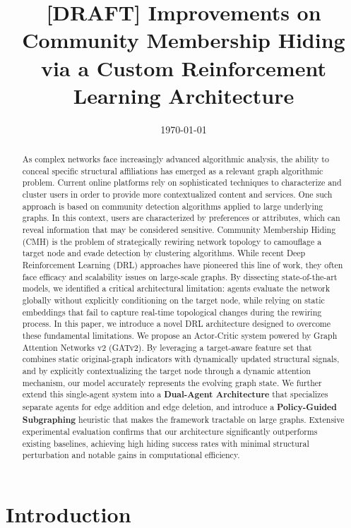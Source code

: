 \documentclass[a4paper]{article}
\title{\textbf{[DRAFT] Improvements on Community Membership Hiding\\
via a Custom Reinforcement Learning Architecture}}
\author{}
\date{\today}
\begin{document}
\maketitle

\begin{abstract}
As complex networks face increasingly advanced algorithmic analysis, the ability
to conceal specific structural affiliations has emerged as a relevant graph
algorithmic problem. Current online platforms rely on sophisticated techniques
to characterize and cluster users in order to provide more contextualized content
and services. One such approach is based on community detection algorithms applied
to large underlying graphs. In this context, users are characterized by preferences
or attributes, which can reveal information that may be considered sensitive.
Community Membership Hiding (CMH) is the problem of strategically rewiring network
topology to camouflage a target node and evade detection by clustering algorithms.
While recent Deep Reinforcement Learning (DRL) approaches have pioneered this line
of work, they often face efficacy and scalability issues on large-scale graphs.
By dissecting state-of-the-art models, we identified a critical architectural
limitation: agents evaluate the network globally without explicitly conditioning on
the target node, while relying on static embeddings that fail to capture real-time
topological changes during the rewiring process.
In this paper, we introduce a novel DRL architecture designed to overcome these
fundamental limitations. We propose an Actor-Critic system powered by Graph
Attention Networks v2 (GATv2). By leveraging a target-aware feature set that
combines static original-graph indicators with dynamically updated structural
signals, and by explicitly contextualizing the target node through a dynamic
attention mechanism, our model accurately represents the evolving graph state.
We further extend this single-agent system into a \textbf{Dual-Agent Architecture}
that specializes separate agents for edge addition and edge deletion, and introduce
a \textbf{Policy-Guided Subgraphing} heuristic that makes the framework tractable
on large graphs. Extensive experimental evaluation confirms that our architecture
significantly outperforms existing baselines, achieving high hiding success rates
with minimal structural perturbation and notable gains in computational efficiency.
\end{abstract}


\section{Introduction}
\end{document}
